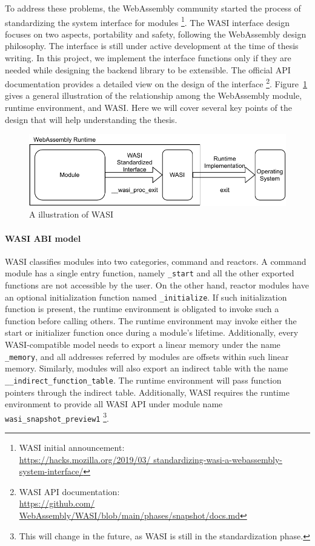 To address these problems, the WebAssembly community started the process of
standardizing the system interface for modules
\footnote{WASI initial announcement: \\\url{https://hacks.mozilla.org/2019/03/
    standardizing-wasi-a-webassembly-system-interface/}}. The WASI interface
design focuses on two aspects, portability and safety, following the WebAssembly
design philosophy. The interface is still under active development at the time
of thesis writing. In this project, we implement the interface functions only
if they are needed while designing the backend library to be extensible. The
official API documentation provides a detailed view on the design of the
interface \footnote{WASI API documentation: \\\url{https://github.com/
    WebAssembly/WASI/blob/main/phases/snapshot/docs.md}}.
Figure~\ref{fig:wasi-intro} gives a general illustration of the relationship
among the WebAssembly module, runtime environment, and WASI. Here we will cover
several key points of the design that will help understanding the thesis.

\begin{figure}
  \centering
  \includegraphics{Images/wasi-intro.pdf}
  \caption{A illustration of WASI}
  \label{fig:wasi-intro}
\end{figure}

\paragraph{WASI ABI model}
WASI classifies modules into two categories, command and reactors. A command
module has a single entry function, namely \texttt{\_start} and all the other
exported functions are not accessible by the user. On the other hand, reactor
modules have an optional initialization function named \texttt{\_initialize}.
If such initialization function is present, the runtime environment is obligated
to invoke such a function before calling others. The runtime environment may
invoke either the start or initializer function once during a module's lifetime.
Additionally, every WASI-compatible model needs to export a linear memory under
the name \texttt{\_memory}, and all addresses referred by modules are offsets
within such linear memory. Similarly, modules will also export an indirect table
with the name \texttt{\_\_indirect\_function\_table}. The runtime environment
will pass function pointers through the indirect table. Additionally, WASI
requires the runtime environment to provide all WASI API under module name
\texttt{wasi\_snapshot\_preview1} \footnote{This will change in the future, as
  WASI is still in the standardization phase.}.

